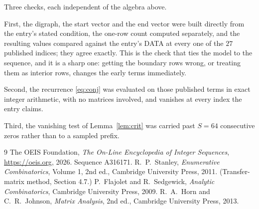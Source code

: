 \documentclass[11pt,a4paper]{article}
\theoremstyle{plain}
\theoremstyle{definition}
\begin{document}
Three checks, each independent of the algebra above.

First, the digraph, the start vector and the end vector were built directly from the
entry's stated condition, the one-row count computed separately, and the resulting values
compared against the entry's DATA at every one of the $27$ published indices; they
agree exactly. This is the check that ties the model to the sequence, and it is a sharp one:
getting the boundary rows wrong, or treating them as interior rows, changes the early terms
immediately.

Second, the recurrence \eqref{eq:conj} was evaluated on those published terms in exact
integer arithmetic, with no matrices involved, and vanishes at every index the entry claims.

Third, the vanishing test of Lemma~\ref{lem:crit} was carried past $S=64$ consecutive
zeros rather than to a sampled prefix.

\begin{thebibliography}{9}
 The OEIS Foundation, \emph{The On-Line Encyclopedia of Integer
Sequences}, \url{https://oeis.org}, 2026. Sequence A316171.
 R.~P.~Stanley, \emph{Enumerative Combinatorics}, Volume 1, 2nd ed.,
Cambridge University Press, 2011. (Transfer-matrix method, Section 4.7.)
 P.~Flajolet and R.~Sedgewick, \emph{Analytic Combinatorics}, Cambridge
University Press, 2009.
 R.~A.~Horn and C.~R.~Johnson, \emph{Matrix Analysis}, 2nd ed., Cambridge
University Press, 2013.
\end{thebibliography}
\end{document}
